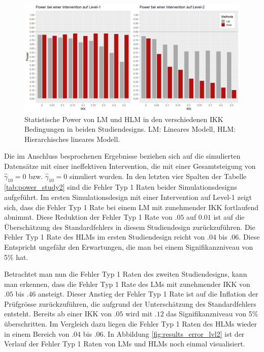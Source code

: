 \documentclass[12pt]{article}\usepackage[]{graphicx}\usepackage[]{color}
\begin{document}
\begin{figure}[t!]
\centering
\captionsetup{width=\textwidth}
\includegraphics[width = \textwidth]{./figures/results_power}
\caption{Statistische Power von LM und HLM in den verschiedenen IKK Bedingungen in beiden Studiendesigns. LM: Lineares Modell, HLM: Hierarchisches lineares Modell.}
\label{fig:results_power}
\end{figure}

Die im Anschluss besprochenen Ergebnisse beziehen sich auf die simulierten Datensätze mit einer ineffektiven Intervention, die mit einer Gesamtsteigung von $\widehat{\gamma}_{10} = 0$ bzw. $\widehat{\gamma}_{10} = 0$ simuliert wurden. In den letzten vier Spalten der Tabelle \ref{tab:power_study2} sind die Fehler Typ 1 Raten beider Simulationsdesigns aufgeführt. Im ersten Simulationsdesign mit einer Intervention auf Level-1 zeigt sich, dass die Fehler Typ 1 Rate bei einem LM mit zunehmender IKK fortlaufend abnimmt. Diese Reduktion der Fehler Typ 1 Rate von $.05$ auf $0.01$ ist auf die Überschätzung des Standardfehlers in diesem Studiendesign zurückzuführen. Die Fehler Typ 1 Rate des HLMs im ersten Studiendesign reicht von $.04$ bis $.06$. Diese Entspricht ungefähr den Erwartungen, die man bei einem Signifikanzniveau von 5\% hat.

Betrachtet man nun die Fehler Typ 1 Raten des zweiten Studiendesigns, kann man erkennen, dass die Fehler Typ 1 Rate des LMs mit zunehmender IKK von $.05$ bis $.46$ ansteigt. Dieser Anstieg der Fehler Typ 1 Rate ist auf die Inflation der Prüfgrösse zurückzuführen, die aufgrund der Unterschätzung des Standardfehlers entsteht. Bereits ab einer IKK von $.05$ wird mit $.12$ das Signifikanzniveau von 5\% überschritten. Im Vergleich dazu liegen die Fehler Typ 1 Raten des HLMs wieder in einem Bereich von $.04$ bis $.06$. In Abbildung \ref{fig:results_error_lvl2} ist der Verlauf der Fehler Typ 1 Raten von LMs und HLMs noch einmal visualisiert. 
\end{document}
